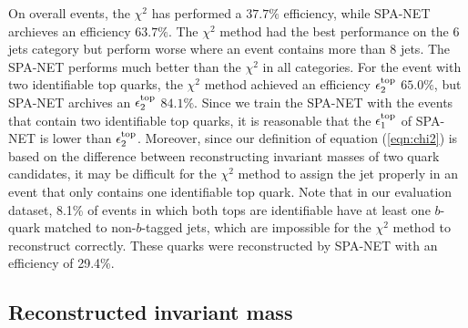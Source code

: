 On overall events, the $\chi^{2}$ has performed a $37.7\%$ efficiency, while SPA-NET archieves an efficiency $63.7\%$. The $\chi^{2}$ method had the best performance on the 6 jets category but perform worse where an event contains more than 8 jets. The SPA-NET performs much better than the $\chi^{2}$ in all categories. For the event with two identifiable top quarks, the $\chi^{2}$ method achieved an efficiency $\epsilon^{\rm top}_{2}$ $65.0\%$, but SPA-NET archives an $\epsilon^{\rm top}_{2}$ $84.1\%$. Since we train the SPA-NET with the events that contain two identifiable top quarks, it is reasonable that the $\epsilon^{\rm top}_{1}$ of SPA-NET is lower than $\epsilon^{\rm top}_{2}$. Moreover, since our definition of equation (\ref{eqn:chi2}) is based on the difference between reconstructing invariant masses of two quark candidates, it may be difficult for the $\chi^{2}$ method to assign the jet properly in an event that only contains one identifiable top quark. Note that in our evaluation dataset, 8.1\% of events in which both tops are identifiable have at least one $b$-quark matched to non-$b$-tagged jets, which are impossible for the $\chi^{2}$ method to reconstruct correctly.  These quarks were reconstructed by SPA-NET with an efficiency of 29.4\%.

\subsection{Reconstructed invariant mass }\label{subsec:reco inv mass }

